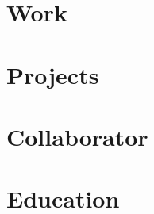 \documentclass[12pt, a4paper, sans, obeyspaces, unicode]{moderncv}
\begin{document}
\maketitle

\vspace{0.5cm}
\section{Work}

    

\section{Projects}

    

\section{Collaborator}

    

\section{Education}

    
\end{document}
